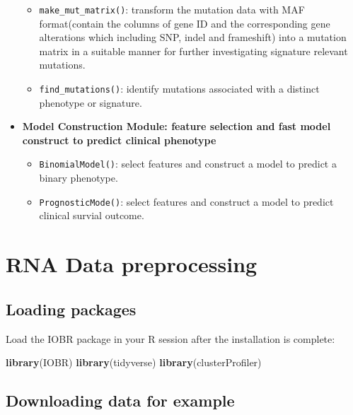 \documentclass[
  12pt,
]{book}
\newenvironment{Shaded}{\begin{snugshade}}{\end{snugshade}}
\newcommand{\FunctionTok}[1]{\textcolor[rgb]{0.13,0.29,0.53}{\textbf{#1}}}
\newcommand{\NormalTok}[1]{#1}
\providecommand{\tightlist}{%
  \setlength{\itemsep}{0pt}\setlength{\parskip}{0pt}}
\theoremstyle{definition}
\theoremstyle{definition}
\theoremstyle{definition}
\theoremstyle{definition}
\theoremstyle{remark}
\begin{document}
\begin{itemize}
  \begin{itemize}
  \tightlist
  \item
    \texttt{make\_mut\_matrix()}: transform the mutation data with MAF format(contain the columns of gene ID and the corresponding gene alterations which including SNP, indel and frameshift) into a mutation matrix in a suitable manner for further investigating signature relevant mutations.
  \item
    \texttt{find\_mutations()}: identify mutations associated with a distinct phenotype or signature.
  \end{itemize}
\item
  \textbf{Model Construction Module: feature selection and fast model construct to predict clinical phenotype}

  \begin{itemize}
  \tightlist
  \item
    \texttt{BinomialModel()}: select features and construct a model to predict a binary phenotype.
  \item
    \texttt{PrognosticMode()}: select features and construct a model to predict clinical survial outcome.
  \end{itemize}
\end{itemize}

\hypertarget{rna-data-preprocessing}{%
\chapter{\texorpdfstring{\textbf{RNA Data preprocessing}}{RNA Data preprocessing}}\label{rna-data-preprocessing}}

\hypertarget{loading-packages}{%
\section{Loading packages}\label{loading-packages}}

Load the IOBR package in your R session after the installation is complete:

\begin{Shaded}
\begin{Highlighting}[]
\FunctionTok{library}\NormalTok{(IOBR)}
\FunctionTok{library}\NormalTok{(tidyverse)}
\FunctionTok{library}\NormalTok{(clusterProfiler)}
\end{Highlighting}
\end{Shaded}

\hypertarget{downloading-data-for-example}{%
\section{Downloading data for example}\label{downloading-data-for-example}}
\end{document}
